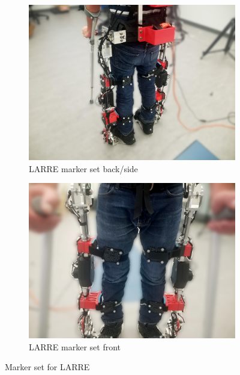 \begin{figure}
    \begin{subfigure}{0.5\textwidth}
        \centering
        \captionsetup{justification=centering}
        \centerline{
        \includegraphics[scale=0.1, frame]{images/mech_design/exo_markers_back.png}}
        \caption[LARRE marker set back/side]{LARRE marker set back/side}
        \label{fig:larremarkerside}
    \end{subfigure}
    \begin{subfigure}{0.5\textwidth}
        \centering
        \captionsetup{justification=centering}
        \centerline{
        \includegraphics[scale=0.1, frame]{images/mech_design/exo_markers_front.png}}
        \caption[LARRE marker set front]{LARRE marker set front}
        \label{fig:larremarkerfront}
    \end{subfigure}    
    \caption{Marker set for LARRE}
    \label{fig:larremarker}
\end{figure}



